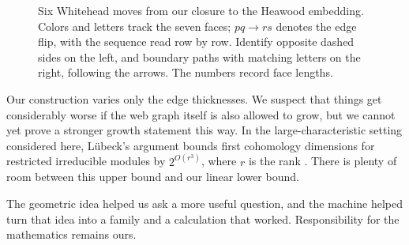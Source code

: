 \documentclass[a4paper,11pt]{amsart}
\numberwithin{equation}{subsection}
\theoremstyle{plain}
\theoremstyle{definition}
\theoremstyle{remark}
\begin{document}
\begin{figure}[htbp]
\caption{Six Whitehead moves from our closure to the Heawood embedding.
Colors and letters track the seven faces; $pq\to rs$ denotes
the edge flip, with the sequence read row by row.
Identify opposite dashed sides on the left, and boundary paths
with matching letters on the right, following the arrows.
The numbers record face lengths.}
\label{fig:heawood-moves}
\end{figure}

\begin{samepage}
\begin{remark}
Our construction varies only the edge thicknesses.
We suspect that things get considerably worse if the web
graph itself is also allowed to grow, but we cannot yet
prove a stronger growth statement this way.
In the large-characteristic setting considered here,
L\"ubeck's argument bounds first cohomology dimensions
for restricted irreducible modules by $2^{O(r^3)}$,
where $r$ is the rank
\cite[Remark~(d) after Theorem~4.7]{Luebeck}.
There is plenty of room between this upper bound and
our linear lower bound.
\end{remark}
\end{samepage}

The geometric idea helped us ask a more useful question,
and the machine helped turn that idea into a family and
a calculation that worked. 
Responsibility for the mathematics remains ours.
\end{document}

